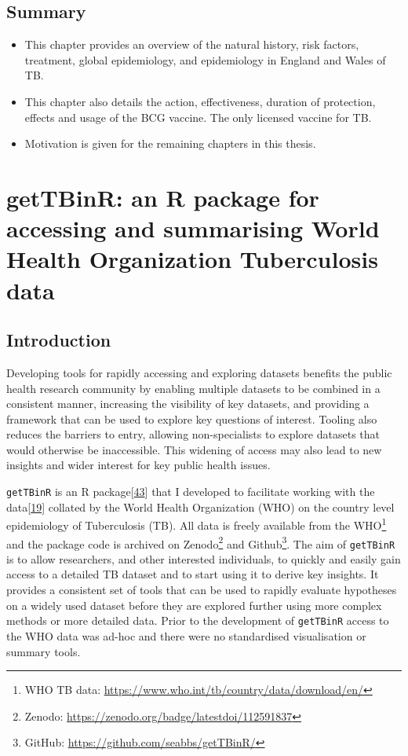 \documentclass[11pt,twoside]{bristolthesis}
\begin{document}
  \hypertarget{summary-1}{%
  \section{Summary}\label{summary-1}}
  \begin{itemize}
  \item
    This chapter provides an overview of the natural history, risk factors, treatment, global epidemiology, and epidemiology in England and Wales of TB.
  \item
    This chapter also details the action, effectiveness, duration of protection, effects and usage of the BCG vaccine. The only licensed vaccine for TB.
  \item
    Motivation is given for the remaining chapters in this thesis.
  \end{itemize}
  \hypertarget{getTBinR}{%
  \chapter{getTBinR: an R package for accessing and summarising World Health Organization Tuberculosis data}\label{getTBinR}}
  
  \hypertarget{introduction-1}{%
  \section{Introduction}\label{introduction-1}}
  
  Developing tools for rapidly accessing and exploring datasets benefits the public health research community by enabling multiple datasets to be combined in a consistent manner, increasing the visibility of key datasets, and providing a framework that can be used to explore key questions of interest. Tooling also reduces the barriers to entry, allowing non-specialists to explore datasets that would otherwise be inaccessible. This widening of access may also lead to new insights and wider interest for key public health issues.
  
  \texttt{getTBinR} is an R package{[}\protect\hyperlink{ref-RCoreTeam2019}{43}{]} that I developed to facilitate working with the data{[}\protect\hyperlink{ref-WHO:2018}{19}{]} collated by the World Health Organization (WHO) on the country level epidemiology of Tuberculosis (TB). All data is freely available from the WHO\footnote{WHO TB data: \url{https://www.who.int/tb/country/data/download/en/}} and the package code is archived on Zenodo\footnote{Zenodo: \url{https://zenodo.org/badge/latestdoi/112591837}} and Github\footnote{GitHub: \url{https://github.com/seabbs/getTBinR/}}. The aim of \texttt{getTBinR} is to allow researchers, and other interested individuals, to quickly and easily gain access to a detailed TB dataset and to start using it to derive key insights. It provides a consistent set of tools that can be used to rapidly evaluate hypotheses on a widely used dataset before they are explored further using more complex methods or more detailed data. Prior to the development of \texttt{getTBinR} access to the WHO data was ad-hoc and there were no standardised visualisation or summary tools.
  
\end{document}
